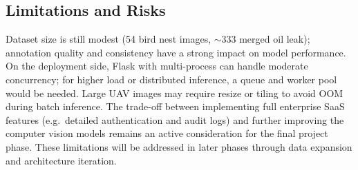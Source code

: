 \documentclass[12pt,a4paper]{article}
\begin{document}
\subsection{Limitations and Risks}

Dataset size is still modest (54 bird nest images, $\sim$333 merged oil leak); annotation quality and consistency have a strong impact on model performance. On the deployment side, Flask with multi-process can handle moderate concurrency; for higher load or distributed inference, a queue and worker pool would be needed. Large UAV images may require resize or tiling to avoid OOM during batch inference. The trade-off between implementing full enterprise SaaS features (e.g.\ detailed authentication and audit logs) and further improving the computer vision models remains an active consideration for the final project phase. These limitations will be addressed in later phases through data expansion and architecture iteration.
\end{document}

